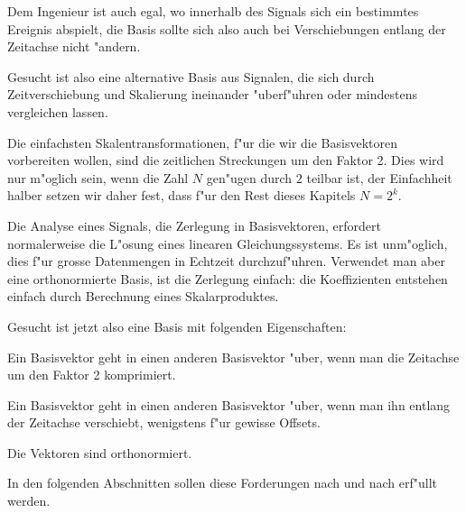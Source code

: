 Dem Ingenieur ist auch egal, wo innerhalb des Signals sich
ein bestimmtes Ereignis abspielt, die Basis sollte sich also
auch bei Verschiebungen entlang der Zeitachse nicht "andern.

Gesucht ist also eine alternative Basis aus Signalen, die
sich durch Zeitverschiebung und Skalierung ineinander "uberf"uhren
oder mindestens vergleichen lassen.

Die einfachsten Skalentransformationen, f"ur die wir die Basisvektoren
vorbereiten wollen, sind die zeitlichen Streckungen um den Faktor 2.
Dies wird nur m"oglich sein, wenn die Zahl $N$ gen"ugen durch $2$
teilbar ist, der Einfachheit halber setzen wir daher fest, dass
f"ur den Rest dieses Kapitels $N=2^k$.

Die Analyse eines Signals, die Zerlegung in Basisvektoren, erfordert
normalerweise die L"osung eines linearen Gleichungssystems.
Es ist unm"oglich, dies f"ur grosse Datenmengen in Echtzeit
durchzuf"uhren. Verwendet man aber eine orthonormierte Basis,
ist die Zerlegung einfach: die Koeffizienten entstehen einfach
durch Berechnung eines Skalarproduktes.

Gesucht ist jetzt also eine Basis mit folgenden Eigenschaften:
\begin{compactenum}
\item Ein Basisvektor geht in einen anderen Basisvektor "uber, wenn
man die Zeitachse um den Faktor 2 komprimiert.
\item Ein Basisvektor geht in einen anderen Basisvektor "uber, wenn
man ihn entlang der Zeitachse verschiebt, wenigstens f"ur
gewisse Offsets.
\item Die Vektoren sind orthonormiert.
\end{compactenum}
In den folgenden Abschnitten sollen diese Forderungen nach und
nach erf"ullt werden.


